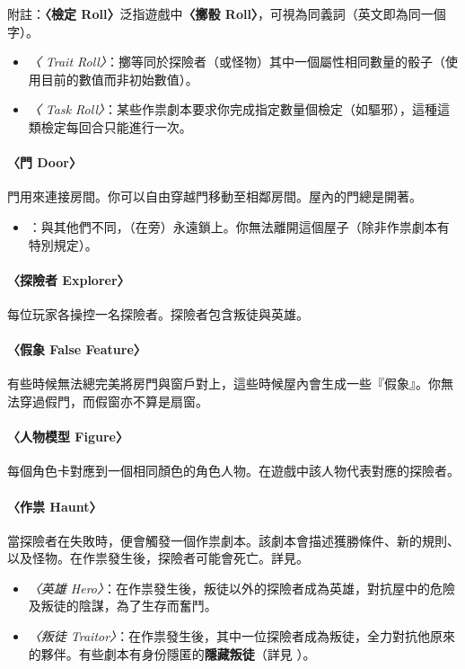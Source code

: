 附註：\textbf{〈檢定 Roll〉}泛指遊戲中\textbf{〈擲骰 Roll〉}，可視為同義詞（英文即為同一個字）。

\begin{itemize}
	\item \textit{〈 Trait Roll〉}：擲等同於探險者（或怪物）其中一個屬性相同數量的骰子（使用目前的數值而非初始數值）。
	\item \textit{〈 Task Roll〉}：某些作祟劇本要求你完成指定數量個檢定（如驅邪），這種這類檢定每回合只能進行一次。
\end{itemize}

\paragraph{〈門 Door〉}
門用來連接房間。你可以自由穿越門移動至相鄰房間。屋內的門總是開著。

\begin{itemize}
	\item \textit{}：與其他們不同，（在旁）永遠鎖上。你無法離開這個屋子（除非作祟劇本有特別規定）。
\end{itemize}

\paragraph{〈探險者 Explorer〉}
每位玩家各操控一名探險者。探險者包含叛徒與英雄。

\paragraph{〈假象 False Feature〉}
有些時候無法總完美將房門與窗戶對上，這些時候屋內會生成一些『假象』。你無法穿過假門，而假窗亦不算是扇窗。

\paragraph{〈人物模型 Figure〉}
每個角色卡對應到一個相同顏色的角色人物。在遊戲中該人物代表對應的探險者。

\paragraph{〈作祟 Haunt〉}
當探險者在失敗時，便會觸發一個作祟劇本。該劇本會描述獲勝條件、新的規則、以及怪物。在作祟發生後，探險者可能會死亡。詳見。

\begin{itemize}
	\item \textit{〈英雄 Hero〉}：在作祟發生後，叛徒以外的探險者成為英雄，對抗屋中的危險及叛徒的陰謀，為了生存而奮鬥。
	\item \textit{〈叛徒 Traitor〉}：在作祟發生後，其中一位探險者成為叛徒，全力對抗他原來的夥伴。有些劇本有身份隱匿的\textbf{隱藏叛徒}（詳見 ）。
\end{itemize}

